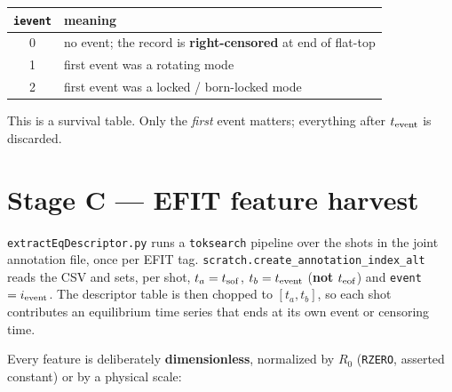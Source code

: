 \documentclass[11pt,a4paper]{article}
\newcommand{\code}[1]{\texttt{\small #1}}
\begin{document}
\begin{center}
\begin{tabular}{@{}cl@{}}
\toprule
\code{ievent} & meaning \\
\midrule
0 & no event; the record is \textbf{right-censored} at end of flat-top \\
1 & first event was a rotating mode \\
2 & first event was a locked / born-locked mode \\
\bottomrule
\end{tabular}
\end{center}

This is a survival table. Only the \emph{first} event matters; everything after $t_{\rm event}$ is
discarded.

\section{Stage C --- EFIT feature harvest}

\code{extractEqDescriptor.py} runs a \code{toksearch} pipeline over the shots in the joint
annotation file, once per EFIT tag. \code{scratch.create\_annotation\_index\_alt} reads the CSV and
sets, per shot, $t_a = t_{\rm sof}$, $t_b = t_{\rm event}$ (\textbf{not} $t_{\rm eof}$) and
\code{event}$=i_{\rm event}$. The descriptor table is then chopped to $[t_a,t_b]$, so each shot
contributes an equilibrium time series that ends at its own event or censoring time.

Every feature is deliberately \textbf{dimensionless}, normalized by $R_0$ (\code{RZERO}, asserted
constant) or by a physical scale:
\end{document}
